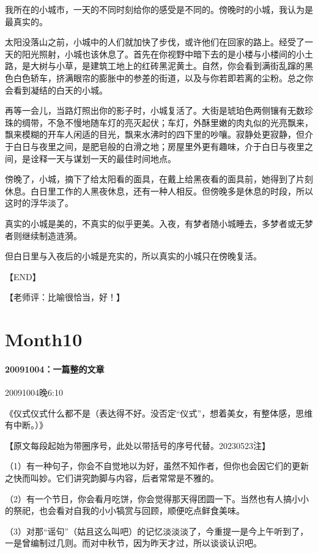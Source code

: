 \documentclass[UTF8]{Diaries}
\begin{document}
我所在的小城市，一天的不同时刻给你的感受是不同的。傍晚时的小城，我认为是最真实的。

太阳没落山之前，小城中的人们就加快了步伐，或许他们在回家的路上。经受了一天的阳光照射，小城也该休息了。首先在你视野中暗下去的是小楼与小楼间的小土路，是大树与小草，是建筑工地上的红砖黑泥黄土。自然，你会看到满街乱蹿的黑色白色轿车，挤满眼帘的膨胀中的参差的街道，以及与你若即若离的尘粉。总之你会看到凝结的白天的小城。

再等一会儿，当路灯照出你的影子时，小城复活了。大街是琥珀色两侧镶有无数珍珠的绸带，不急不慢地随车灯的亮灭起伏；车灯，外酥里嫩的肉丸似的光亮飘来，飘来模糊的开车人闲适的目光，飘来水沸时的四下里的吵嚷。寂静处更寂静，但介于白日与夜里之间，是肥皂般的白滑之地；房屋里外更有趣味，介于白日与夜里之间，是诠释一天与谋划一天的最佳时间地点。

傍晚了，小城，摘下了给太阳看的面具，在戴上给黑夜看的面具前，她得到了片刻休息。白日里工作的人黑夜休息，还有一种人相反。但傍晚多是休息的时段，所以这时的浮华淡了。

真实的小城是美的，不真实的似乎更美。入夜，有梦者随小城睡去，多梦者或无梦者则继续制造涟漪。

但白日里与入夜后的小城是充实的，所以真实的小城只在傍晚复活。

【END】

【老师评：比喻很恰当，好！】



\section{Month10}

\paragraph{20091004：一篇整的文章}

20091004晚6:10

《仪式仪式什么都不是（表达得不好。没否定“仪式”，想着美女，有整体感，思维有中断。）》

【原文每段起始为带圈序号，此处以带括号的序号代替。20230523注】

（1）有一种句子，你会不自觉地以为好，虽然不知作者，但你也会因它们的更新之快而叫妙。它们讲究韵脚与内容，后者常常是不雅的。

（2）有一个节日，你会看月吃饼，你会觉得那天得团圆一下。当然也有人搞小小的祭祀，也会看对自我的小小犒赏与回顾，顺便吃点鲜食美味。

（3）对那“谣句”（姑且这么叫吧）的记忆淡淡淡了，今重提一是今上午听到了，一是曾编制过几则。而对中秋节，因为昨天才过，所以谈谈认识吧。
\end{document}
